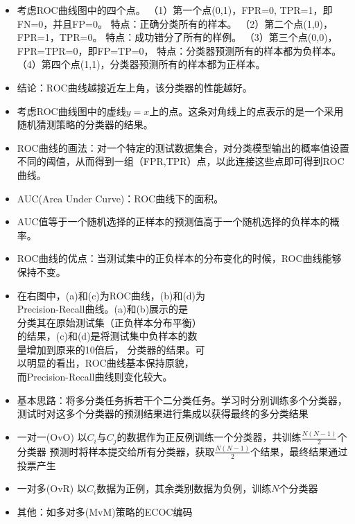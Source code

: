 \documentclass[10pt,a4paper]{ctexbook}
\begin{document}
\begin{itemize}

\item 考虑ROC曲线图中的四个点。
    \subitem（1）第一个点(0,1)，FPR=0, TPR=1，即FN=0，并且FP=0。
        \subsubitem 特点：正确分类所有的样本。
    \subitem（2）第二个点(1,0)，FPR=1，TPR=0。
        \subsubitem 特点：成功错分了所有的样例。
    \subitem（3）第三个点(0,0)，FPR=TPR=0，即FP=TP=0，
        \subsubitem 特点：分类器预测所有的样本都为负样本。
    \subitem（4）第四个点(1,1)，分类器预测所有的样本都为正样本。
\item 结论：ROC曲线越接近左上角，该分类器的性能越好。
\item 考虑ROC曲线图中的虚线$y=x$上的点。这条对角线上的点表示的是一个采用随机猜测策略的分类器的结果。

\item ROC曲线的画法：对一个特定的测试数据集合，对分类模型输出的概率值设置不同的阈值，从而得到一组（FPR,TPR）点，以此连接这些点即可得到ROC曲线。
\item AUC(Area Under Curve)：ROC曲线下的面积。
\item AUC值等于一个随机选择的正样本的预测值高于一个随机选择的负样本的概率。
\item ROC曲线的优点：当测试集中的正负样本的分布变化的时候，ROC曲线能够保持不变。

\item 在右图中，(a)和(c)为ROC曲线，(b)和(d)为\\
Precision-Recall曲线。(a)和(b)展示的是\\
分类其在原始测试集（正负样本分布平衡）\\
的结果，(c)和(d)是将测试集中负样本的数\\
量增加到原来的10倍后， 分类器的结果。可\\
以明显的看出，ROC曲线基本保持原貌，\\
而Precision-Recall曲线则变化较大。

\item 基本思路：将多分类任务拆若干个二分类任务。学习时分别训练多个分类器，测试时对这多个分类器的预测结果进行集成以获得最终的多分类结果
\item 一对一(OvO) 
    \subitem 以$C_{i}$与$C_{j}$的数据作为正反例训练一个分类器，共训练${\frac {N(N-1)}{2}}$个分类器
    \subitem 预测时将样本提交给所有分类器，获取${\frac {N(N-1)}{2}}$个结果，最终结果通过投票产生
\item 一对多(OvR)
    \subitem 以$C_{i}$数据为正例，其余类别数据为负例，训练$N$个分类器
\item 其他：如多对多(MvM)策略的ECOC编码
\end{itemize}
\end{document}

